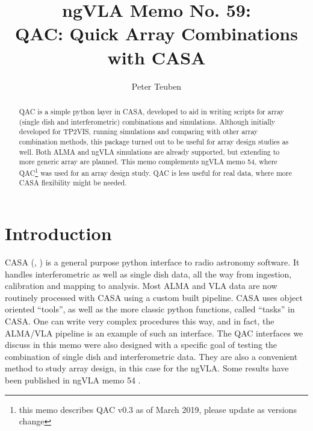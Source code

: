 \documentclass[11pt,twoside]{article}
\begin{document}
\title{ngVLA Memo No. 59: \\ QAC: Quick Array Combinations with CASA}
\author{Peter Teuben}



\begin{abstract}

QAC is a simple python layer in CASA, developed to aid in writing
scripts for array (single dish and interferometric) combinations and
simulations. Although initially developed for TP2VIS, running
simulations and comparing with other array combination methods, this
package turned out to be useful for array design studies as well. Both
ALMA and ngVLA simulations are already supported, but extending
to more generic array are planned. This memo complements ngVLA memo
54, where QAC\footnote{this memo describes QAC v0.3 as of March 2019,
  please update as versions change}
was used for an array design study. QAC is less useful for
real data, where more CASA flexibility might be needed.


\end{abstract}




\section{Introduction}

CASA (\citet{casa1}, \citet{casa2}) 
is a general purpose python interface to radio
astronomy software. It handles interferometric as well as single dish
data, all the way from ingestion, calibration and mapping to
analysis. Most ALMA and VLA data are now routinely processed with CASA
using a custom built pipeline.  CASA uses object oriented
``tools'', as well as the more classic python functions, called
``tasks'' in CASA. One can write very complex procedures this way, and in fact, the
ALMA/VLA pipeline is an example of such an interface. The QAC
interfaces we discuss in this memo were also designed with a specific
goal of testing the combination of single dish and interferometric data. They
are also a convenient method to study array design, in this case for the ngVLA.
Some results have been published in ngVLA memo 54 \citep{memo54}.
\end{document}
